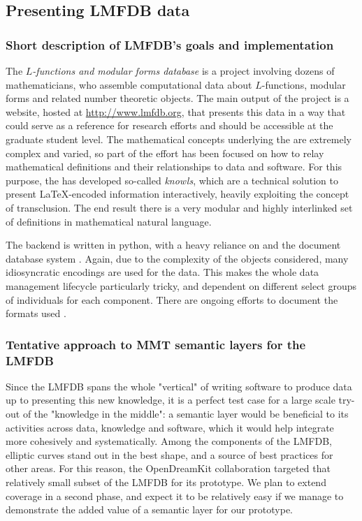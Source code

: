 \subsection{Presenting LMFDB data}
\subsubsection{Short description of LMFDB's goals and implementation}
The \emph{$L$-functions and modular forms database} is a project involving dozens of  mathematicians, who assemble computational data about $L$-functions, modular  forms and related number theoretic objects. The main output of the project is a website, hosted at \url{http://www.lmfdb.org}, that presents this data in a way that could serve as a reference for research efforts and should be accessible at the graduate student level.  The mathematical concepts underlying the \LMFDB are extremely complex and varied, so part of the effort has been focused on how to relay mathematical definitions and their relationships to data and software. For this purpose, the \LMFDB has developed so-called \emph{knowls}, which are a technical solution to present \LaTeX-encoded information interactively, heavily exploiting the concept of transclusion. The end result there is a very modular and highly interlinked set of definitions in mathematical natural language. 
 
The \LMFDB backend is written in \textsf{python}, with a heavy reliance on \Sage and the document database system \Mongo \cite{lmfdb-repo}. Again, due to the complexity of the objects considered, many idiosyncratic encodings are used for the data. This makes the whole data management lifecycle particularly tricky, and dependent on different select groups of individuals for each component. There are ongoing efforts to document the formats used \cite{lmfdb-formats}.


\subsubsection{Tentative approach to MMT semantic layers for the LMFDB}
Since the LMFDB spans the whole "vertical" of writing software to produce data up to presenting this new knowledge,  it is a perfect test case for a large scale try-out of the "knowledge in the middle": a semantic layer would be beneficial to its activities across data, knowledge and software, which it would help integrate more cohesively and systematically. Among the components of the LMFDB, elliptic curves stand out in the best shape, and a source of best practices for other areas. For this reason, the OpenDreamKit collaboration targeted that relatively small subset of the LMFDB for its prototype. We plan to extend coverage in a second phase, and expect it to be relatively easy if we manage to demonstrate the added value of a semantic layer for our prototype. 

